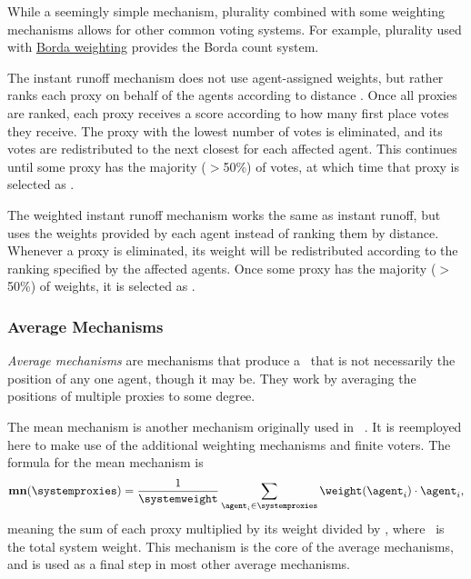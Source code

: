 While a seemingly simple mechanism, plurality combined with some
weighting mechanisms allows for other common voting systems.
For example, plurality used with \hyperref[para:borda]{Borda weighting}
provides the Borda count system.  

\label{para:cand-instant-runoff}
The instant runoff mechanism does not use agent-assigned weights, but rather
ranks each proxy on behalf of the agents according to distance .
Once all proxies are ranked, each proxy receives a score according to how
many first place votes they receive.
The proxy with the lowest number of votes is eliminated, and its votes are
redistributed to the next closest for each affected agent.
This continues until some proxy has the majority ($>$50\%) of votes, at which
time that proxy is selected as \systemtruth.  

\label{para:cand-weighted-instant-runoff}
\label{para:candidate-weighted-instant-runoff}
The weighted instant runoff mechanism works the same as instant runoff, but uses
the weights provided by each agent instead of ranking them by distance.
Whenever a proxy is eliminated, its weight will be redistributed according to
the ranking specified by the affected agents.
Once some proxy has the majority ($>$50\%) of weights, it is selected as
\systemtruth.

\subsubsection{Average Mechanisms}\label{subsubsec:average-mechanisms}
\textit{Average mechanisms} are mechanisms that produce a \systemtruth\ that
is not necessarily the position of any one agent, though it may be.
They work by averaging the positions of multiple proxies to some degree.  

\label{para:mean}
The mean mechanism is another mechanism originally used in
~\cite{Cohensius2017}.
It is reemployed here to make use of the additional weighting mechanisms and
finite voters.
The formula for the mean mechanism is
\begin{equation*}
    \mathbf{mn}(\systemproxies) =
    \frac{1}{\systemweight}
    \sum_{\agent_i \in \systemproxies} {\weightof{\agent_i} \cdot \agent_i}
    \text{,}\label{eq:mean-mechanism}
\end{equation*}
meaning the sum of each proxy multiplied by its weight divided by
\systemweight, where \systemweight\ is the total system weight.
This mechanism is the core of the average mechanisms, and is used as a final
step in most other average mechanisms.

